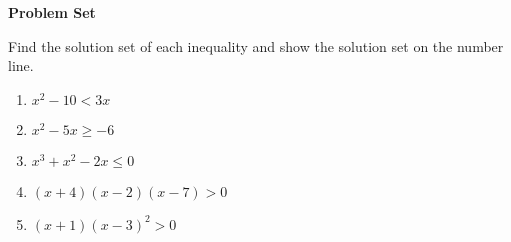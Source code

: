 \textbf{Problem Set}

\vspce

Find the solution set of each inequality and show the solution set on the number line. 
\begin{enumerate}[label = \arabic*. ]
\item \hspce $x^2 -10< 3x $
\item \hspce $x^2 -5x \geq -6$
\item \hspce $x^3+x^2-2x \leq 0 $
\item \hspce $(x+4) (x-2) (x-7) >0 $
\item \hspce $(x+1)(x-3)^2 >0 $
\end{enumerate} 